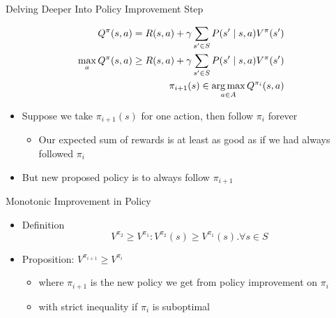 \begin{frame}[c]{Delving Deeper Into Policy Improvement Step}

\begin{eqnarray}
Q^\pi(s,a) = R(s,a) + \gamma \sum_{s' \in S} P(s' \mid s,a) V^\pi(s')\nonumber\\
\max_a Q^\pi(s,a) \geq R(s,a) + \gamma \sum_{s' \in S} P(s' \mid s,a) V^\pi(s') \nonumber\\
\pi_{i+1}(s) \in \operatorname*{arg\,max}_{a\in A} Q^{\pi_i} (s,a)\nonumber
\end{eqnarray}

\begin{itemize}
	\item Suppose we take $\pi_{i+1}(s)$ for one action, then follow $\pi_i$ forever
	\begin{itemize}
		\item Our expected sum of rewards is at least as good as if we had always
		followed $\pi_i$
	\end{itemize}
	\item But new proposed policy is to always follow $\pi_{i+1}$
\end{itemize}

\end{frame}
\begin{frame}[c]{Monotonic Improvement in Policy}

\begin{itemize}
	\item  Definition
	$$ V^{\pi_2} \geq V^{\pi_1}: V^{\pi_2}(s) \geq V^{\pi_1}(s). \forall s \in S $$
	\item Proposition: $V^{\pi_{i+1}} \geq V^{\pi_{i}}$
	\begin{itemize}
		\item where $\pi_{i+1}$ is the new policy we get from policy improvement on $\pi_i$
		\item with strict inequality if $\pi_i$ is suboptimal
	\end{itemize} 
\end{itemize}

\end{frame}
